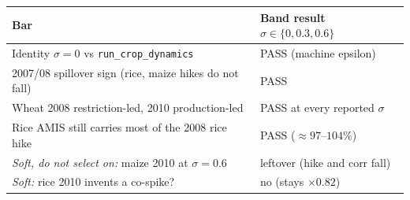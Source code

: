 \begin{tabular}{ll}
\toprule
Bar & Band result \(\sigma\in\{0,0.3,0.6\}\) \\
\midrule
Identity \(\sigma{=}0\) vs \texttt{run\_crop\_dynamics} & PASS (machine epsilon) \\
2007/08 spillover sign (rice, maize hikes do not fall) & PASS \\
Wheat 2008 restriction-led, 2010 production-led & PASS at every reported \(\sigma\) \\
Rice AMIS still carries most of the 2008 rice hike & PASS (\(\approx 97\)--\(104\%\)) \\
\midrule
\textit{Soft, do not select on:} maize 2010 at \(\sigma{=}0.6\) & leftover (hike and corr fall) \\
\textit{Soft:} rice 2010 invents a co-spike? & no (stays \(\times 0.82\)) \\
\bottomrule
\end{tabular}
